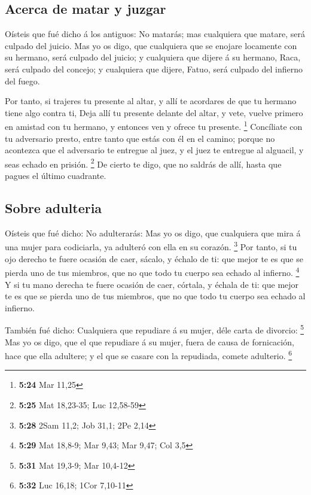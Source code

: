 \hypertarget{acerca-de-matar-y-juzgar}{%
\subsection{Acerca de matar y juzgar}\label{acerca-de-matar-y-juzgar}}

 Oísteis que fué dicho á los antiguos: No matarás; mas
cualquiera que matare, será culpado del juicio.  Mas yo
os digo, que cualquiera que se enojare locamente con su hermano, será
culpado del juicio; y cualquiera que dijere á su hermano, Raca, será
culpado del concejo; y cualquiera que dijere, Fatuo, será culpado del
infierno del fuego.

 Por tanto, si trajeres tu presente al altar, y allí te
acordares de que tu hermano tiene algo contra ti,  Deja
allí tu presente delante del altar, y vete, vuelve primero en amistad
con tu hermano, y entonces ven y ofrece tu presente. \footnote{\textbf{5:24}
  Mar 11,25}  Concíliate con tu adversario presto, entre
tanto que estás con él en el camino; porque no acontezca que el
adversario te entregue al juez, y el juez te entregue al alguacil, y
seas echado en prisión. \footnote{\textbf{5:25} Mat 18,23-35; Luc
  12,58-59}  De cierto te digo, que no saldrás de allí,
hasta que pagues el último cuadrante.

\hypertarget{sobre-adulteria}{%
\subsection{Sobre adulteria}\label{sobre-adulteria}}

 Oísteis que fué dicho: No adulterarás: 
Mas yo os digo, que cualquiera que mira á una mujer para codiciarla, ya
adulteró con ella en su corazón. \footnote{\textbf{5:28} 2Sam 11,2; Job
  31,1; 2Pe 2,14}  Por tanto, si tu ojo derecho te fuere
ocasión de caer, sácalo, y échalo de ti: que mejor te es que se pierda
uno de tus miembros, que no que todo tu cuerpo sea echado al infierno.
\footnote{\textbf{5:29} Mat 18,8-9; Mar 9,43; Mar 9,47; Col 3,5}
 Y si tu mano derecha te fuere ocasión de caer, córtala,
y échala de ti: que mejor te es que se pierda uno de tus miembros, que
no que todo tu cuerpo sea echado al infierno.

 También fué dicho: Cualquiera que repudiare á su mujer,
déle carta de divorcio: \footnote{\textbf{5:31} Mat 19,3-9; Mar 10,4-12}
 Mas yo os digo, que el que repudiare á su mujer, fuera
de causa de fornicación, hace que ella adultere; y el que se casare con
la repudiada, comete adulterio. \footnote{\textbf{5:32} Luc 16,18; 1Cor
  7,10-11}


